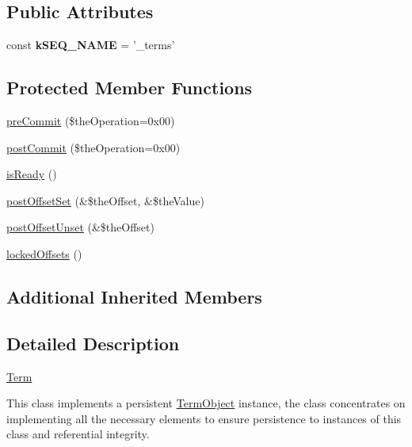 \subsection*{Public Attributes}
\begin{DoxyCompactItemize}
\item 
\hypertarget{class_ontology_wrapper_1_1_term_a5731878c2b563dbc2be121ba29fa7086}{const {\bfseries k\-S\-E\-Q\-\_\-\-N\-A\-M\-E} = '\-\_\-terms'}\label{class_ontology_wrapper_1_1_term_a5731878c2b563dbc2be121ba29fa7086}

\end{DoxyCompactItemize}
\subsection*{Protected Member Functions}
\begin{DoxyCompactItemize}
\item 
\hyperlink{class_ontology_wrapper_1_1_term_a765f0bc982832d1b6dd3732a1c5ef643}{pre\-Commit} (\$the\-Operation=0x00)
\item 
\hyperlink{class_ontology_wrapper_1_1_term_a8db3eede1845e4c53f9aa1a49cb8c719}{post\-Commit} (\$the\-Operation=0x00)
\item 
\hyperlink{class_ontology_wrapper_1_1_term_ae1c796d23d15f49b132025b268c5763b}{is\-Ready} ()
\item 
\hyperlink{class_ontology_wrapper_1_1_term_aa59636200bca2de1b23380a6376f65df}{post\-Offset\-Set} (\&\$the\-Offset, \&\$the\-Value)
\item 
\hyperlink{class_ontology_wrapper_1_1_term_af6d43299cf5932b581548aaf5a8515d9}{post\-Offset\-Unset} (\&\$the\-Offset)
\item 
\hyperlink{class_ontology_wrapper_1_1_term_a174e341c129088cdc8b845e0176d6eb4}{locked\-Offsets} ()
\end{DoxyCompactItemize}
\subsection*{Additional Inherited Members}


\subsection{Detailed Description}
\hyperlink{class_ontology_wrapper_1_1_term}{Term}

This class implements a persistent \hyperlink{class_ontology_wrapper_1_1_term_object}{Term\-Object} instance, the class concentrates on implementing all the necessary elements to ensure persistence to instances of this class and referential integrity.

